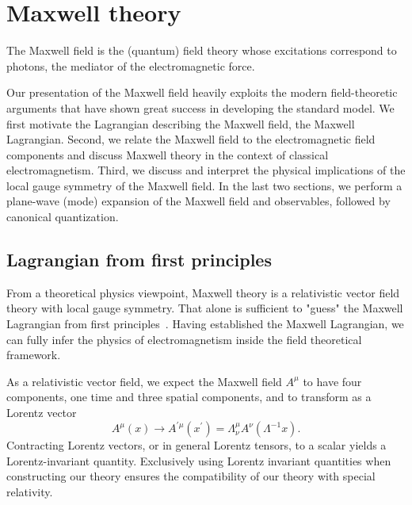 \section{Maxwell theory}

The Maxwell field is the (quantum) field theory whose excitations correspond to photons, the mediator of the electromagnetic force.

Our presentation of the Maxwell field heavily exploits the modern field-theoretic arguments that have shown great success in developing the standard model.
We first motivate the Lagrangian describing the Maxwell field, the Maxwell Lagrangian.
Second, we relate the Maxwell field to the electromagnetic field components and discuss Maxwell theory in the context of classical electromagnetism.
Third, we discuss and interpret the physical implications of the local gauge symmetry of the Maxwell field.
In the last two sections, we perform a plane-wave (mode) expansion of the Maxwell field and observables, followed by canonical quantization.

\subsection{Lagrangian from first principles}

From a theoretical physics viewpoint, Maxwell theory is a relativistic vector field theory with local gauge symmetry.
That alone is sufficient to "guess" the Maxwell Lagrangian from first principles~\cite[p.~149]{Greiner2013}.
Having established the Maxwell Lagrangian, we can fully infer the physics of electromagnetism inside the field theoretical framework.

As a relativistic vector field, we expect the Maxwell field $A^\mu$ to have four components, one time and three spatial components, and to transform as a Lorentz vector~\cite[p.~37]{Peskin1995}
\begin{equation}
	A^\mu(x)
	\to
	A^{\prime\mu}(x^\prime)
	=
	\Lambda^\mu_\nu
	A^\nu(\Lambda^{-1}x)
	.
\end{equation}
Contracting Lorentz vectors, or in general Lorentz tensors, to a scalar yields a Lorentz-invariant quantity.
Exclusively using Lorentz invariant quantities when constructing our theory ensures the compatibility of our theory with special relativity.

